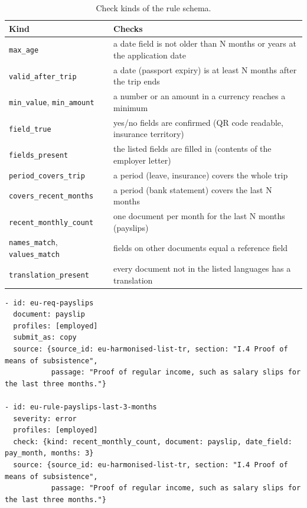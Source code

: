 \begin{table}[ht]
  \centering
  \small
  \caption{Check kinds of the rule schema.}
  \label{tab:rule-kinds}
  \begin{tabularx}{\textwidth}{@{}lX@{}}
    \toprule
    Kind & Checks \\
    \midrule
    \texttt{max\_age} & a date field is not older than N months or years at the application date \\
    \texttt{valid\_after\_trip} & a date (passport expiry) is at least N months after the trip ends \\
    \texttt{min\_value}, \texttt{min\_amount} & a number or an amount in a currency reaches a minimum \\
    \texttt{field\_true} & yes/no fields are confirmed (QR code readable, insurance territory) \\
    \texttt{fields\_present} & the listed fields are filled in (contents of the employer letter) \\
    \texttt{period\_covers\_trip} & a period (leave, insurance) covers the whole trip \\
    \texttt{covers\_recent\_months} & a period (bank statement) covers the last N months \\
    \texttt{recent\_monthly\_count} & one document per month for the last N months (payslips) \\
    \texttt{names\_match}, \texttt{values\_match} & fields on other documents equal a reference field \\
    \texttt{translation\_present} & every document not in the listed languages has a translation \\
    \bottomrule
  \end{tabularx}
\end{table}

\begin{lstlisting}[caption={A requirement and its rule in \texttt{data/requirements/eu-tr.yaml}.},label={lst:rule}]
- id: eu-req-payslips
  document: payslip
  profiles: [employed]
  submit_as: copy
  source: {source_id: eu-harmonised-list-tr, section: "I.4 Proof of means of subsistence",
           passage: "Proof of regular income, such as salary slips for the last three months."}

- id: eu-rule-payslips-last-3-months
  severity: error
  profiles: [employed]
  check: {kind: recent_monthly_count, document: payslip, date_field: pay_month, months: 3}
  source: {source_id: eu-harmonised-list-tr, section: "I.4 Proof of means of subsistence",
           passage: "Proof of regular income, such as salary slips for the last three months."}
\end{lstlisting}

